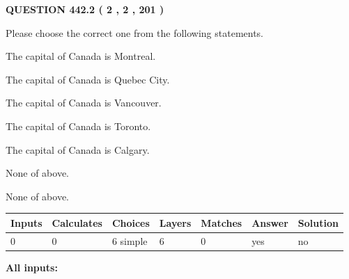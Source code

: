 \documentclass[12pt]{article}
\begin{document}
   
  
\vspace{0.2in}
  
{\textbf{\Large{QUESTION
442.2 
 ( 2 , 2 , 201 )
}}}
  
  
Please choose the correct one from the following statements.
 
 
The capital of Canada is Montreal.
 
 
The capital of Canada is Quebec City.
 
 
The capital of Canada is Vancouver.
 
 
The capital of Canada is Toronto.
 
 
The capital of Canada is Calgary.
 
 
 None of above.
 
 
\noindent{}
 
 
 None of above.
 
 
\noindent{}
 
 
   
   
   
   
\noindent\begin{tabular}{|l|l|l|l|l|l|l|}
 \hline
Inputs & Calculates & Choices & Layers & Matches & Answer & Solution \\ \hline
 0  & 
 0  & 
 6
  simple  
  & 
 6  & 
 0  & 
  yes & 
  no 
  \\ \hline
 \end{tabular}
   
   
   
   
\noindent{}
   
   
   
   
\noindent\vspace{0.1in}\hspace{-0.08in} {\textbf{\Large{All inputs: }}}
   
   
   
   
   
   
 \vspace{0.2in}
 
   
   
\end{document}
